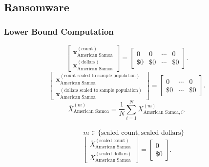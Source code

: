\subsection{Ransomware}\label{sec:ransomware}
\subsubsection{Lower Bound Computation}
\[
\begin{bmatrix}
\mathbf{x}_{\text{American Samoa}}^{(\text{count})}\\
\mathbf{x}_{\text{American Samoa}}^{(\text{dollars})}
\end{bmatrix}
=
\begin{bmatrix}
0 & 0 & \cdots & 0\\
\$0 &\$0 & \cdots &\$0 
\end{bmatrix}.
\]
\[
\begin{bmatrix}
\mathbf{x}_{\text{American Samoa}}^{(\text{count scaled to sample population})}\\
\mathbf{x}_{\text{American Samoa}}^{(\text{dollars scaled to sample population})}
\end{bmatrix}
=
\begin{bmatrix}
0 & \cdots & 0\\
\$0 & \cdots &\$0
\end{bmatrix}.
\]
  \[
\bar{X}_{\text{American Samoa}}^{(m)}
= \frac{1}{N}\sum_{i=1}^{N} X_{\text{American Samoa},i}^{(m)},
\]
\\
\[
\qquad
m \in \{\text{scaled count},\text{scaled dollars}\}
\]
\[
\begin{bmatrix}
\bar{X}_{\text{American Samoa}}^{(\text{scaled count})}\\
\bar{X}_{\text{American Samoa}}^{(\text{scaled dollars})}
\end{bmatrix}
=
\begin{bmatrix}
0\\
\$0
\end{bmatrix}.
\]
